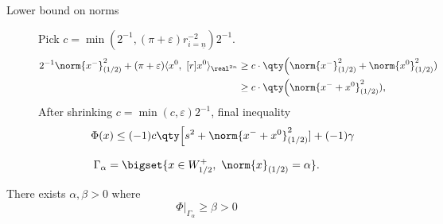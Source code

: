 \documentclass[../main-v2-manifolds.tex]{subfiles}
\begin{document}
\begin{description}
    \item[Lower bound on norms] Pick $c = \min(2^{-1},(\pi + \varepsilon)r^{-2}_{i=\underline{n}})2^{-1}$.
    \begin{align*}
        2^{-1}\norm{x^-}^2_{(1/2)} + (\pi + \varepsilon)\langle x^0,\ [r]x^0\rangle_{\realtn} &\geq c\cdot\qty\Big(\norm{x^-}^2_{(1/2)} + \norm{x^0}^2_{(1/2)})\\
        &\geq c\cdot\qty\Big(\norm{x^- + x^0}^2_{(1/2)}),
    \end{align*}
    After shrinking $c = \min(c,\varepsilon)2^{-1}$, final inequality
    \[
        \Phi(x)\leq (-1)c\qty\Big[s^2 + \norm{x^- + x^0}^2_{(1/2)}] + (-1)\gamma
    \]
\end{description}
\begin{definition}
    \[
        \Gamma_\alpha = \bigset{x\in W^{+}_{1/2},\ \norm{x}_{(1/2)} = \alpha}.
    \]
\end{definition}
\begin{wts}
    There exists $\alpha,\beta>0$ where
    \[
        \Phi\vert_{\Gamma_{\alpha}}\geq \beta >0
    \]
\end{wts}
   
\ifSubfilesClassLoaded{%
}{}
\end{document}

